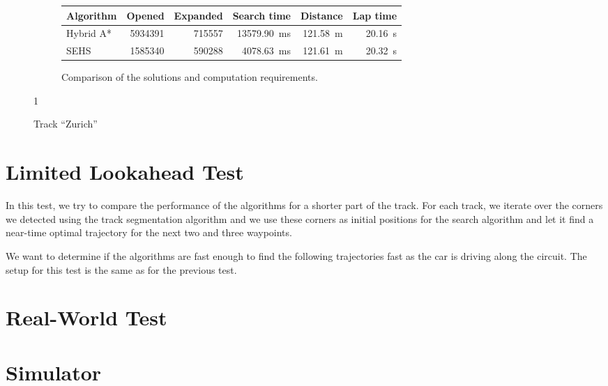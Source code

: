 \begin{figure}[!tbp]
	\vspace{0.75cm}
	
	\begin{subfigure}[t]{\textwidth}
		\centering
		\begin{tabular}{l r r r r r}%
			\toprule
			Algorithm & Opened & Expanded & Search time & Distance & Lap time \\
			\midrule
			Hybrid A* & \num{5934391} & \num{715557} & \SI{13579.90}{\milli\second} & \bftab \SI{121.58}{\meter} & \bftab \SI{20.16}{\second} \\
			SEHS & \bftab \num{1585340} & \bftab \num{590288} & \bftab \SI{4078.63}{\milli\second} & \SI{121.61}{\meter} & \SI{20.32}{\second} \\
			\bottomrule
		\end{tabular}
		\caption{Comparison of the solutions and computation requirements.}
		\label{table:zurich}
	\end{subfigure}
	
1	\vspace{0.75cm}

	\caption{Track ``Zurich''}
	\label{fig:zurich}
\end{figure}

\section{Limited Lookahead Test}

In this test, we try to compare the performance of the algorithms for a shorter part of the track. For each track, we iterate over the corners we detected using the track segmentation algorithm and we use these corners as initial positions for the search algorithm and let it find a near-time optimal trajectory for the next two and three waypoints.

We want to determine if the algorithms are fast enough to find the following trajectories fast as the car is driving along the circuit. The setup for this test is the same as for the previous test.


\section{Real-World Test}


\section{Simulator}


